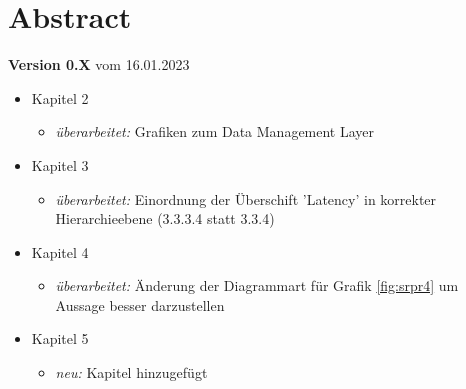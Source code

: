 \cleardoublepage

\chapter*{Abstract}
    
    \large
    \textbf{Version 0.X}
    \normalsize
    vom 16.01.2023 \\
   
   	\begin{itemize}
		\item Kapitel 2
		\begin{itemize}
  			\item \textit{überarbeitet:} Grafiken zum Data Management Layer
		\end{itemize}

		\item Kapitel 3
		\begin{itemize}
  			\item \textit{überarbeitet:} Einordnung der Überschift 'Latency' in korrekter Hierarchieebene (3.3.3.4 statt 3.3.4)
		\end{itemize}
		
		
		\item Kapitel 4
		\begin{itemize}
  			\item \textit{überarbeitet:} Änderung der Diagrammart für Grafik \ref{fig:srpr4} um Aussage besser darzustellen
		\end{itemize}
		
		\item Kapitel 5
		\begin{itemize}
  			\item \textit{neu:} Kapitel hinzugefügt
		\end{itemize} 
	\end{itemize}
